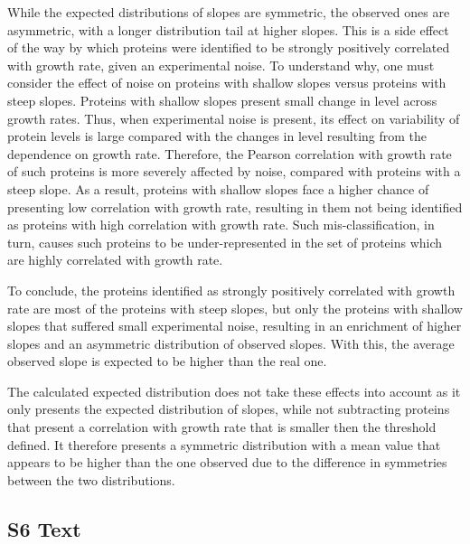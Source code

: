 \documentclass[10pt,letterpaper]{article}
\begin{document}
While the expected distributions of slopes are symmetric, the observed ones are asymmetric, with a longer distribution tail at higher slopes.
This is a side effect of the way by which proteins were identified to be strongly positively correlated with growth rate, given an experimental noise.
To understand why, one must consider the effect of noise on proteins with shallow slopes versus proteins with steep slopes.
Proteins with shallow slopes present small change in level across growth rates.
Thus, when experimental noise is present, its effect on variability of protein levels is large compared with the changes in level resulting from the dependence on growth rate.
Therefore, the Pearson correlation with growth rate of such proteins is more severely affected by noise, compared with proteins with a steep slope.
As a result, proteins with shallow slopes face a higher chance of presenting low correlation with growth rate, resulting in them not being identified as proteins with high correlation with growth rate.
Such mis-classification, in turn, causes such proteins to be under-represented in the set of proteins which are highly correlated with growth rate.

To conclude, the proteins identified as strongly positively correlated with growth rate are most of the proteins with steep slopes, but only the proteins with shallow slopes that suffered small experimental noise, resulting in an enrichment of higher slopes and an asymmetric distribution of observed slopes.
With this, the average observed slope is expected to be higher than the real one.

The calculated expected distribution does not take these effects into account as it only presents the expected distribution of slopes, while not subtracting proteins that present a correlation with growth rate that is smaller then the threshold defined.
It therefore presents a symmetric distribution with a mean value that appears to be higher than the one observed due to the difference in symmetries between the two distributions.

\subsection*{S6 Text}
\label{lbanalysis}
\end{document}
